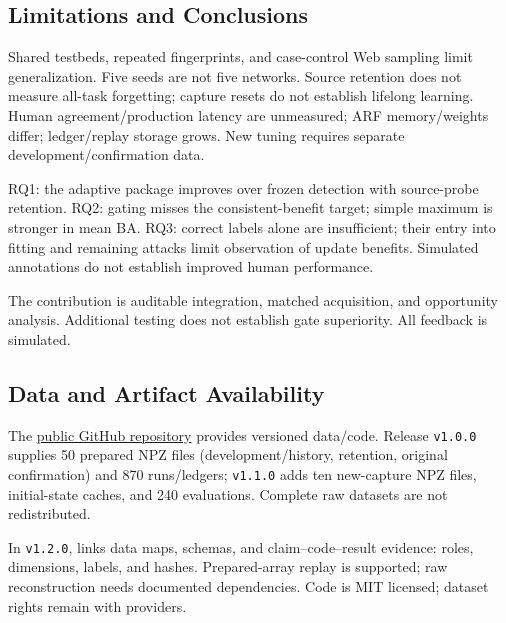 \documentclass[conference]{IEEEtran}
\begin{document}
\balance
\subsection{Limitations and Conclusions}
Shared testbeds, repeated fingerprints, and case-control Web sampling limit generalization. Five seeds are not five networks. Source retention does not measure all-task forgetting; capture resets do not establish lifelong learning. Human agreement/production latency are unmeasured; ARF memory/weights differ; ledger/replay storage grows. New tuning requires separate development/confirmation data.

RQ1: the adaptive package improves over frozen detection with source-probe retention. RQ2: gating misses the consistent-benefit target; simple maximum is stronger in mean BA. RQ3: correct labels alone are insufficient; their entry into fitting and remaining attacks limit observation of update benefits. Simulated annotations do not establish improved human performance.

The contribution is auditable integration, matched acquisition, and opportunity analysis. Additional testing does not establish gate superiority. All feedback is simulated.

\subsection{Data and Artifact Availability}
The \href{https://github.com/langss1/verified-feedback-adaptive-ids}{public GitHub repository} provides versioned data/code. Release \texttt{v1.0.0} supplies 50 prepared NPZ files (development/history, retention, original confirmation) and 870 runs/ledgers; \texttt{v1.1.0} adds ten new-capture NPZ files, initial-state caches, and 240 evaluations. Complete raw datasets are not redistributed.

In \texttt{v1.2.0},  links data maps, schemas, and claim--code--result evidence: roles, dimensions, labels, and hashes. Prepared-array replay is supported; raw reconstruction needs documented dependencies. Code is MIT licensed; dataset rights remain with providers.


\end{document}
